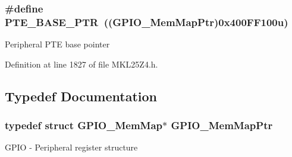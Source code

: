 \subsubsection[{\texorpdfstring{P\+T\+E\+\_\+\+B\+A\+S\+E\+\_\+\+P\+TR}{PTE_BASE_PTR}}]{\setlength{\rightskip}{0pt plus 5cm}\#define P\+T\+E\+\_\+\+B\+A\+S\+E\+\_\+\+P\+TR~(({\bf G\+P\+I\+O\+\_\+\+Mem\+Map\+Ptr})0x400\+F\+F100u)}\hypertarget{group___g_p_i_o___peripheral_gaa230685f72ad1540850ab8d12366775c}{}\label{group___g_p_i_o___peripheral_gaa230685f72ad1540850ab8d12366775c}
Peripheral P\+TE base pointer 

Definition at line 1827 of file M\+K\+L25\+Z4.\+h.



\subsection{Typedef Documentation}
\subsubsection[{\texorpdfstring{G\+P\+I\+O\+\_\+\+Mem\+Map\+Ptr}{GPIO_MemMapPtr}}]{\setlength{\rightskip}{0pt plus 5cm}typedef struct {\bf G\+P\+I\+O\+\_\+\+Mem\+Map}$\ast$ {\bf G\+P\+I\+O\+\_\+\+Mem\+Map\+Ptr}}\hypertarget{group___g_p_i_o___peripheral_ga31c1eddda45aa085f51142987e05ada5}{}\label{group___g_p_i_o___peripheral_ga31c1eddda45aa085f51142987e05ada5}
G\+P\+IO -\/ Peripheral register structure 